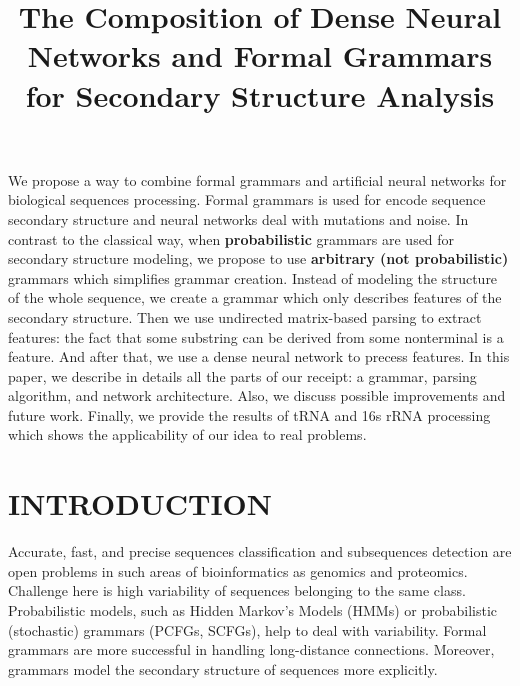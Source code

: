 \documentclass[a4paper,twoside]{article}
\begin{document}
\title{The Composition of Dense Neural Networks and Formal Grammars for Secondary Structure Analysis}

\author{
}


\abstract
{
We propose a way to combine formal grammars and artificial neural networks for biological sequences processing.
Formal grammars is used for encode sequence secondary structure and neural networks deal with mutations and noise.
In contrast to the classical way, when \textbf{probabilistic} grammars are used for secondary structure modeling, we propose to use \textbf{arbitrary (not probabilistic)} grammars which simplifies grammar creation.
Instead of modeling the structure of the whole sequence, we create a grammar which only describes features of the secondary structure.
Then we use undirected matrix-based parsing to extract features: the fact that some substring can be derived from some nonterminal is a feature. 
And after that, we use a dense neural network to precess features.
In this paper, we describe in details all the parts of our receipt: a grammar, parsing algorithm, and network architecture.
Also, we discuss possible improvements and future work.
Finally, we provide the results of tRNA and 16s rRNA processing which shows the applicability of our idea to real problems.
}

\onecolumn \maketitle \normalsize \vfill

\section{\uppercase{Introduction}}
\label{sec:introduction}

\noindent Accurate, fast, and precise sequences classification and subsequences detection are open problems in such areas of bioinformatics as genomics and proteomics. 
Challenge here is high variability of sequences belonging to the same class.
Probabilistic models, such as Hidden Markov's Models (HMMs) or probabilistic (stochastic) grammars (PCFGs, SCFGs), help to deal with variability.
Formal grammars are more successful in handling long-distance connections.
Moreover, grammars model the secondary structure of sequences more explicitly.
\end{document}
